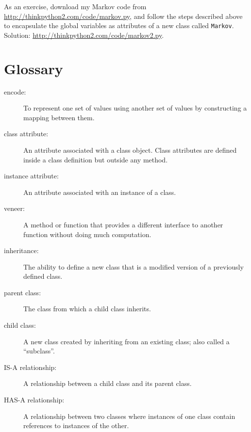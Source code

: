 \documentclass[10pt]{book}
\begin{document}
As an exercise, download my Markov code from
\url{http://thinkpython2.com/code/markov.py}, and follow the steps
described above to encapsulate the global variables as attributes of a
new class called {\tt Markov}.  Solution:
\url{http://thinkpython2.com/code/markov2.py}.


\section{Glossary}

\begin{description}

\item[encode:]  To represent one set of values using another
set of values by constructing a mapping between them.

\item[class attribute:] An attribute associated with a class
object.  Class attributes are defined inside
a class definition but outside any method.

\item[instance attribute:] An attribute associated with an
instance of a class.

\item[veneer:] A method or function that provides a different
interface to another function without doing much computation.

\item[inheritance:] The ability to define a new class that is a
modified version of a previously defined class.

\item[parent class:] The class from which a child class inherits.

\item[child class:] A new class created by inheriting from an
existing class; also called a ``subclass''.

\item[IS-A relationship:] A relationship between a child class
and its parent class.

\item[HAS-A relationship:] A relationship between two classes
where instances of one class contain references to instances of
the other.


\end{description}
\end{document}
